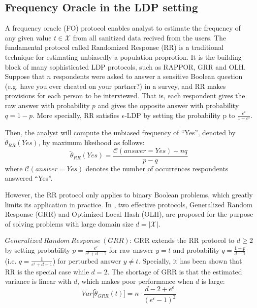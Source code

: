 \documentclass[conference]{IEEEtran}
\begin{document}
\subsection{Frequency Oracle in the LDP setting}
A frequency oracle (FO) protocol enables analyst to estimate the frequency of any given value $t \in \mathcal{X}$ from all sanitized data recived from the users. The fundamental protocol called Randomized Response (RR)\cite{rr} is a traditional technique for estimating unbiasedly a population proprotion. It is the building block of many sophisticated LDP protocols, such as RAPPOR\cite{rappor}, GRR and OLH\cite{a8}. Suppose that $n$ respondents were asked to answer a sensitive Boolean question (e.g. have you ever cheated on your partner?) in a survey, and RR makes provisions for each person to be interviewed. That is, each respondent gives the raw answer with probability $p$ and gives the opposite answer with probability $q = 1-p$. More specially, RR satisfies $\epsilon$-LDP by setting the probability p to $\frac{e^{\epsilon}}{1+e^{\epsilon}}$. 

Then, the analyst will compute the unbiased frequency of ``Yes'', denoted by $\tilde{\theta}_{RR}(Yes)$, by maximum likeihood as follows:
$$\tilde{\theta}_{RR}(Yes) = \frac{\mathcal{C}(answer=Yes) - nq}{p-q}$$
where $\mathcal{C}(answer=Yes)$ denotes the number of occurrences respondents answered ``Yes''. 

However, the RR protocol only applies to binary Boolean problems, which greatly limits its application in practice. In \cite{a8}, two effective protocols, Generalized Random Response (GRR) and Optimized Local Hash (OLH), are proposed for the purpose of solving problems with large domain size $d = |\mathcal{X}|$.

$Generalized\ Random\ Response\ (GRR)$\cite{a8}: GRR extends the RR protocol to $d \geq 2$ by setting probability $p = \frac{e^{\epsilon}}{e^{\epsilon} + d - 1}$ for raw answer $y = t$ and probability $q = \frac{1-p}{d-1}$ (i.e. $q =\frac{1}{e^{\epsilon} + d - 1}$) for perturbed answer $y \neq t$. Specially, it has been shown that RR is the special case while $d = 2$. The shortage of GRR is that the estimated variance is linear with $d$, which makes poor performance when $d$ is large: 
\begin{equation}
Var\big[\tilde{\theta}_{GRR}(t)\big] = n \cdot \frac{d - 2+e^{\epsilon}}{(e^{\epsilon}-1)^2} 
\label{grr variance}
\end{equation}

\end{document}
